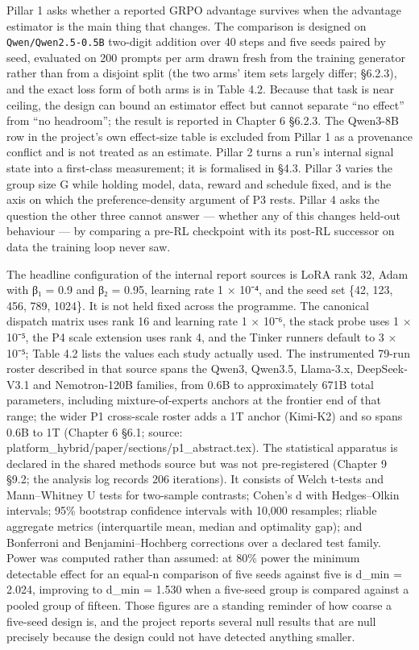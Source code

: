 \documentclass[12pt,a4paper]{report}
\begin{document}
Pillar 1 asks whether a reported GRPO advantage survives when the
advantage estimator is the main thing that changes. The comparison is
designed on \texttt{Qwen/Qwen2.5-0.5B} two-digit addition over 40 steps
and five seeds paired by seed, evaluated on 200 prompts per arm drawn
fresh from the training generator rather than from a disjoint split (the
two arms' item sets largely differ; §6.2.3), and the exact loss form of
both arms is in Table 4.2. Because that task is near ceiling, the design
can bound an estimator effect but cannot separate ``no effect'' from
``no headroom''; the result is reported in Chapter 6 §6.2.3. The
Qwen3-8B row in the project's own effect-size table is excluded from
Pillar 1 as a provenance conflict and is not treated as an estimate.
Pillar 2 turns a run's internal signal state into a first-class
measurement; it is formalised in §4.3. Pillar 3 varies the group size G
while holding model, data, reward and schedule fixed, and is the axis on
which the preference-density argument of P3 rests. Pillar 4 asks the
question the other three cannot answer --- whether any of this changes
held-out behaviour --- by comparing a pre-RL checkpoint with its post-RL
successor on data the training loop never saw.

The headline configuration of the internal report sources is LoRA rank
32, Adam with β₁ = 0.9 and β₂ = 0.95, learning rate 1 × 10⁻⁴, and the
seed set \{42, 123, 456, 789, 1024\}. It is not held fixed across the
programme. The canonical dispatch matrix uses rank 16 and learning rate
1 × 10⁻⁶, the stack probe uses 1 × 10⁻⁵, the P4 scale extension uses
rank 4, and the Tinker runners default to 3 × 10⁻⁵; Table 4.2 lists the
values each study actually used. The instrumented 79-run roster
described in that source spans the Qwen3, Qwen3.5, Llama-3.x,
DeepSeek-V3.1 and Nemotron-120B families, from 0.6B to approximately
671B total parameters, including mixture-of-experts anchors at the
frontier end of that range; the wider P1 cross-scale roster adds a 1T
anchor (Kimi-K2) and so spans 0.6B to 1T (Chapter 6 §6.1; source:
platform\_hybrid/paper/sections/p1\_abstract.tex). The statistical
apparatus is declared in the shared methods source but was not
pre-registered (Chapter 9 §9.2; the analysis log records 206
iterations). It consists of Welch t-tests and Mann--Whitney U tests for
two-sample contrasts; Cohen's d with Hedges--Olkin intervals; 95\%
bootstrap confidence intervals with 10,000 resamples; rliable aggregate
metrics (interquartile mean, median and optimality gap); and Bonferroni
and Benjamini--Hochberg corrections over a declared test family. Power
was computed rather than assumed: at 80\% power the minimum detectable
effect for an equal-n comparison of five seeds against five is d\_min =
2.024, improving to d\_min = 1.530 when a five-seed group is compared
against a pooled group of fifteen. Those figures are a standing reminder
of how coarse a five-seed design is, and the project reports several
null results that are null precisely because the design could not have
detected anything smaller.
\end{document}
